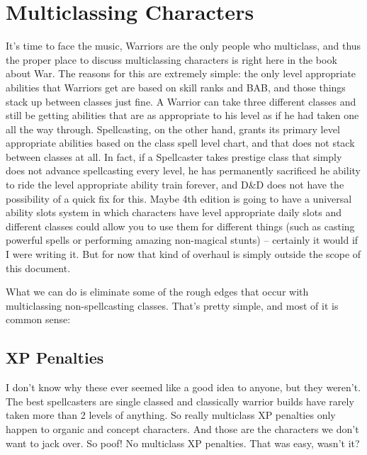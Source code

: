 \section{Multiclassing Characters}
\vspace{-10pt}

It's time to face the music, Warriors are the only people who multiclass, and thus the proper place to discuss multiclassing characters is right here in the book about War. The reasons for this are extremely simple: the only level appropriate abilities that Warriors get are based on skill ranks and BAB, and those things stack up between classes just fine. A Warrior can take three different classes and still be getting abilities that are as appropriate to his level as if he had taken one all the way through. Spellcasting, on the other hand, grants its primary level appropriate abilities based on the class spell level chart, and that does not stack between classes at all. In fact, if a Spellcaster takes prestige class that simply does not advance spellcasting every level, he has permanently sacrificed he ability to ride the level appropriate ability train forever, and D\&D does not have the possibility of a quick fix for this. Maybe 4th edition is going to have a universal ability slots system in which characters have level appropriate daily slots and different classes could allow you to use them for different things (such as casting powerful spells or performing amazing non-magical stunts) -- certainly it would if I were writing it. But for now that kind of overhaul is simply outside the scope of this document.

What we can do is eliminate some of the rough edges that occur with multiclassing non-spellcasting classes. That's pretty simple, and most of it is common sense:

\subsection{XP Penalties}
I don't know why these ever seemed like a good idea to anyone, but they weren't. The best spellcasters are single classed and classically warrior builds have rarely taken more than 2 levels of anything. So really multiclass XP penalties only happen to organic and concept characters. And those are the characters we don't want to jack over. So poof! No multiclass XP penalties. That was easy, wasn't it?

